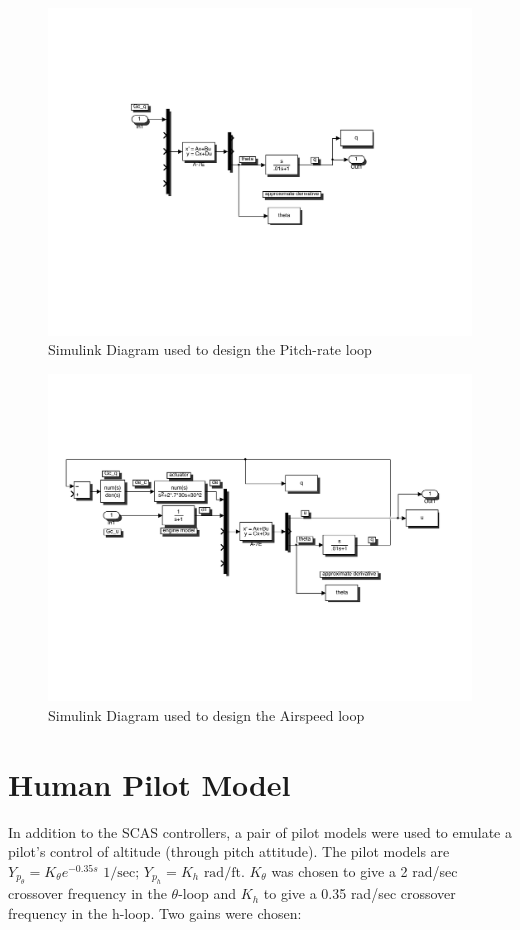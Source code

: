 \documentclass[12pt]{article}
\begin{document}
\begin{figure}[h!]
\begin{center}
\includegraphics[width=.95\textwidth]{figures/controller1}
\caption{Simulink Diagram used to design the Pitch-rate loop}
\end{center}
\end{figure}

\begin{figure}[h!]
\begin{center}
\includegraphics[width=.95\textwidth]{figures/controller2}
\caption{Simulink Diagram used to design the Airspeed loop}
\end{center}
\end{figure}

\clearpage
\section{Human Pilot Model}
In addition to the SCAS controllers, a pair of pilot models were used to emulate a pilot's control of altitude (through pitch attitude). The pilot models are $Y_{p_{\theta}} = K_{\theta}e^{-0.35 s} \mbox{ 1/sec}\mbox{; }Y_{p_{h}} = K_{h} \mbox{ rad/ft}$. $K_{\theta}$ was chosen to give a 2 rad/sec crossover frequency in the $\theta$-loop and $K_h$ to give a 0.35 rad/sec crossover frequency in the h-loop. Two gains were chosen:
\end{document}

